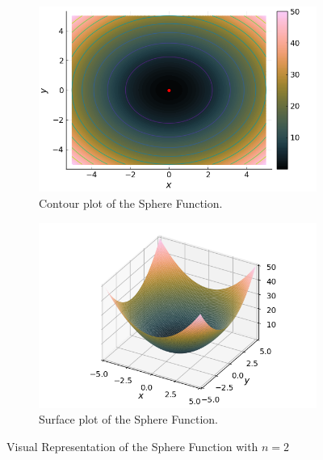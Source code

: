   \begin{figure}[ht!]
    \centering
    \begin{subfigure}[b]{0.45\textwidth}
      \centering
      \includegraphics[width=\textwidth]{img/test_functions/sphere_contour.png}
      \caption{Contour plot of the Sphere Function.}
      \label{fig:app:test:sphere:contour}
    \end{subfigure}
    \hfill
    \begin{subfigure}[b]{0.45\textwidth}
      \centering
      \includegraphics[width=\textwidth]{img/test_functions/sphere_surface.png}
      \caption{Surface plot of the Sphere Function.}
      \label{fig:app:test:sphere:surface}
    \end{subfigure}
    \caption{Visual Representation of the Sphere Function with \(n = 2\)}
    \label{fig:app:test:sphere}
  \end{figure}
